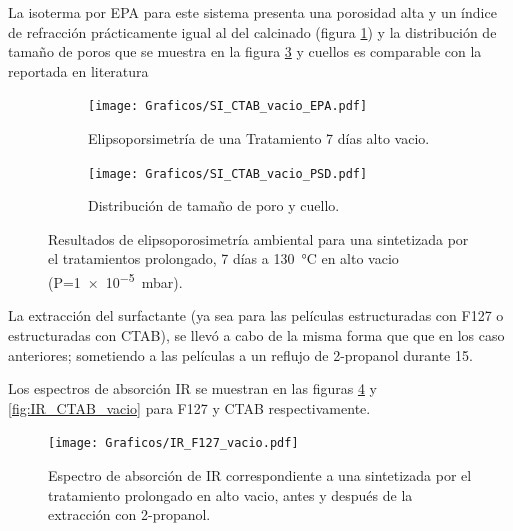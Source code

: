 {		La isoterma por EPA para este sistema presenta una porosidad alta y un índice de refracción prácticamente igual al del calcinado (figura \ref{fig:CTAB_vacio_EPA}) y la distribución de tamaño de poros que se muestra en la figura \ref{fig:CTAB_vacio_PSD} y cuellos es comparable con la reportada en literatura \cite{Boissiere2005}

		\pagebreak		     
				     
 		\begin{figure}[!ht]
		  	\begin{subfigure}[t]{0.495\textwidth}
		  	\texttt{[image: Graficos/SI\_CTAB\_vacio\_EPA.pdf]}
			\caption{Elipsoporsimetría de una \pdmC\space Tratamiento 7 días alto vacio.}
			\label{fig:CTAB_vacio_EPA}
			\end{subfigure}
			\begin{subfigure}[t]{0.495\textwidth}
		  	\texttt{[image: Graficos/SI\_CTAB\_vacio\_PSD.pdf]}
			\caption{Distribución de tamaño de poro y cuello.\\ }
			\label{fig:CTAB_vacio_PSD}
			\end{subfigure}
			\caption[Elipsoporosimetría \pdmC\space tratamiento alto vacio.]{Resultados de elipsoporosimetría ambiental para una \pdmC\space sintetizada por el tratamientos prolongado, 7 días a \SI{130}{\celsius} en alto vacio (P=\SI{1e-5}{\milli\bar}).}
			\end{figure} 	
		
		La extracción del surfactante (ya sea para las películas estructuradas con F127 o estructuradas con CTAB), se llevó a cabo de la misma forma que que en los caso anteriores; sometiendo a las películas a un reflujo de 2-propanol durante \SI{15}{\min}. 

		Los espectros de absorción IR se muestran en las figuras \ref{fig:IR_F127_vacio} y \ref{fig:IR_CTAB_vacio} para F127 y CTAB respectivamente.		

		\begin{figure}[!ht]
			 	\begin{center}
			 	\texttt{[image: Graficos/IR\_F127\_vacio.pdf]}
			 	\caption[FTIR \pdmF\space tratamiento prolongado.]{Espectro de absorción de IR correspondiente a una \pdmF\space sintetizada por el tratamiento prolongado en alto vacio, antes y después de la extracción con 2-propanol.}
			 	\label{fig:IR_F127_vacio}
			 	\end{center}
			 	\end{figure}
			
}
